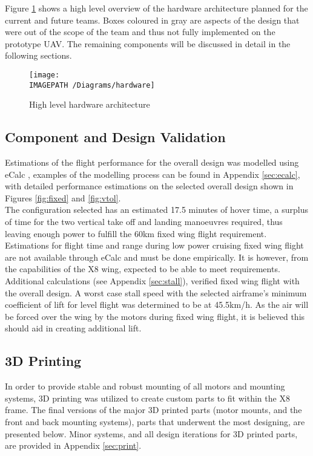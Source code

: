 Figure \ref{fig:hardwarearch} shows a high level overview of the hardware architecture planned for the current and future teams. Boxes coloured in gray are aspects of the design that were out of the scope of the \ID team and thus not fully implemented on the prototype UAV. The remaining components will be discussed in detail in the following sections.

\begin{figure}[!h]
	\centering
	\texttt{[image: \\IMAGEPATH /Diagrams/hardware]}
	\caption{High level hardware architecture}
	\label{fig:hardwarearch}
\end{figure}

\subsection{Component and Design Validation}
Estimations of the flight performance for the overall design was modelled using eCalc \cite{ref:ecalc}, examples of the modelling process can be found in Appendix \ref{sec:ecalc}, with detailed performance estimations on the selected overall design shown in Figures \ref{fig:fixed} and \ref{fig:vtol}.\\

The configuration selected has an estimated 17.5 minutes of hover time, a surplus of time for the two vertical take off and landing manoeuvres required, thus leaving enough power to fulfill the 60km fixed wing flight requirement. Estimations for flight time and range during low power cruising fixed wing flight are not available through eCalc and must be done empirically. It is however, from the capabilities of the X8 wing, expected to be able to meet requirements.\\

Additional calculations (see Appendix \ref{sec:stall}), verified fixed wing flight with the overall design. A worst case stall speed with the selected airframe's minimum coefficient of lift for level flight was determined to be at 45.5km/h. As the air will be forced over the wing by the motors during fixed wing flight, it is believed this should aid in creating additional lift.

\subsection{3D Printing}
In order to provide stable and robust mounting of all motors and mounting systems, 3D printing was utilized to create custom parts to fit within the X8 frame. The final versions of the major 3D printed parts (motor mounts, and the front and back mounting systems), parts that underwent the most designing, are presented below. Minor systems, and all design iterations for 3D printed parts, are provided in Appendix \ref{sec:print}.

